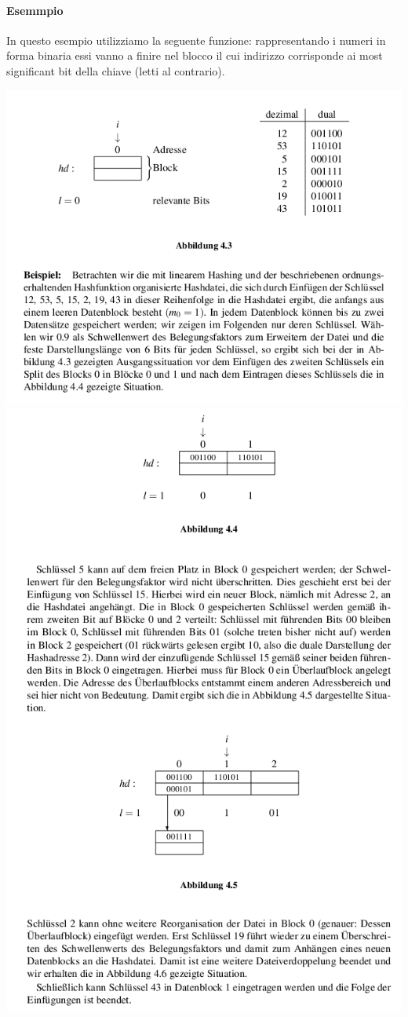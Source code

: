 \documentclass[a4paper]{book}
\begin{document}
\paragraph*{Esemmpio} In questo esempio utilizziamo la seguente funzione: rappresentando i numeri in forma binaria essi vanno a finire nel blocco il cui indirizzo corrisponde ai most significant bit della chiave (letti al contrario). 
\begin{center}
\includegraphics[scale=0.5]{Figures/bsp1.png}
\includegraphics[scale=0.5]{Figures/bsp2.png}

\end{center}
\end{document}
